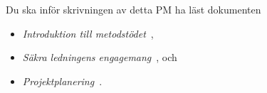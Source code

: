 Du ska inför skrivningen av detta PM ha läst dokumenten
\begin{itemize}
  \item \emph{Introduktion till metodstödet}~\cite{MSB2011itm},
  \item \emph{Säkra ledningens engagemang}~\cite{MSB2011sle}, och
  \item \emph{Projektplanering}~\cite{MSB2011p}.
\end{itemize}
